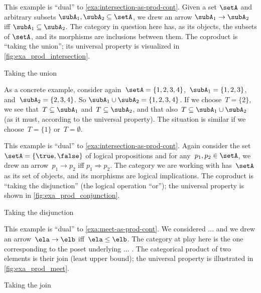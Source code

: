 \begin{example}
    \label{exa:union-as-coprod-cont}
    This example is ``dual'' to \cref{exa:intersection-as-prod-cont}.
    Given a set $\setA$ and arbitrary subsets $\subA_1, \subA_2 \subseteq \setA$, we drew an arrow $\subA_1 \to \subA_2$ iff $\subA_1 \subseteq \subA_2$. The category in question here has, as its objects, the subsets of $\setA$, and its morphisms are inclusions between them.
    The coproduct is ``taking the union''; its universal property is visualized in \cref{fig:exa_prod_intersection}.
    \begin{marginfigure}
        \centering
        \caption{Taking the union}
        \label{fig:exa_coprod_union_cont}
    \end{marginfigure}
    As a concrete example, consider again~$\setA = \{ 1, 2, 3, 4 \}$,~$\subA_1 = \{ 1, 2, 3 \}$, and~$\subA_2 = \{2, 3, 4 \}$. So $\subA_1 \cup \subA_2 = \{1,2, 3,4\}$.
    If we choose~$T = \{ 2 \}$, we see that~$T \subseteq \subA_1$ and~$T \subseteq \subA_2$, and that also~$T \subseteq \subA_1 \cup \subA_2$ (as it must, according to the universal property).
    The situation is similar if we choose~$T = \{ 1\}$ or~$T = \emptyset$.
\end{example}


\begin{example}
    \label{exa:disjunction-as-coprod-cont}
    This example is ``dual'' to \cref{exa:intersection-as-prod-cont}.
    Again consider the set~$\setA = \{ \true, \false \}$ of logical propositions and for any~$p_1, p_2  \in \setA$, we drew an arrow~$p_1 \to p_2$ iff $p_1 \Rightarrow p_2$.
    The category we are working with has~$\setA$ as its set of objects, and its morphisms are logical implications.
    The coproduct is ``taking the disjunction'' (the logical operation ``or''); the universal property is shown in \cref{fig:exa_prod_conjunction}.
    \begin{marginfigure}
        \centering
        \caption{Taking the disjunction}
        \label{fig:exa_coprod_disjunction_cont}
    \end{marginfigure}
\end{example}


\begin{example}
    \label{exa:join-as-coprod-cont}
    This example is ``dual'' to \cref{exa:meet-as-prod-cont}. We considered ... and we drew an arrow~$\ela \to \elb$ iff~$\ela \leq \elb$.
    The category at play here is the one corresponding to the poset underlying ... .
    The categorical product of two elements is their join (least upper bound); the universal property is illustrated in \cref{fig:exa_prod_meet}.
    \begin{marginfigure}
        \centering
        \caption{Taking the join}
        \label{fig:exa_coprod_join_cont}
    \end{marginfigure}
\end{example}

